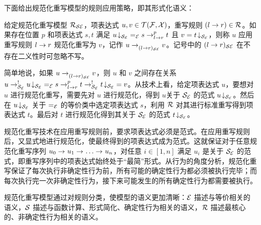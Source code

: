 下面给出规范化重写模型的规则应用策略，即其形式化语义：

\begin{definition}[规范化重写]
\label{d:normalrewriting}
给定规范化重写模型 $\RSE$，项表达式 $u,v\in\TFX$，重写规则 $(l \ra r) \in \cR$。如果存在位置 $p$ 和项表达式 $s,t$ 满足 
${\nf{u}{\SE}} =_{\cE} s \lrps{p}{l\ra r} t$ 且 $v = {\nf{t}{\SE}}$，则称 $u$ 应用重写规则 $l\ra r$ 规范化重写为 $v$，记作 $u\lrps{}{(l\ra r)_{\cS\cE}} v$。记号中的 $(l\ra r)_{\cS\cE}$ 在不存在二义性时可忽略不写。
\end{definition}

简单地说，如果 $u\lrps{}{(l\ra r)_{\cS\cE}}v$，则 $u$ 和 $v$ 之间存在关系 
$u \lrps{!}{\SE} {\nf{u}{\SE}} =_{\cE} s \lrps{p}{l\ra r} t \lrps{!}{\SE} {\nf{t}{\SE}} = v$。从技术上看，给定项表达式 $u$，要想对 $u$ 进行规范化重写，需要先对 $u$ 进行规范化，得到 $u $关于 $\SE$ 的范式 $\nf{u}{\SE}$。然后在 $\nf{u}{\SE}$ 关于 $=_{\cE}$ 的等价类中选定项表达式 $s$，利用 $\cR$ 对其进行标准重写得到项表达式 $t$。最后对 $t$ 进行规范化得到其关于 $\SE$ 的范式 $\nf{t}{\SE}$。

规范化重写技术在应用重写规则前，要求项表达式必须是范式。在应用重写规则后，又显式地进行规范化，使最终得到的项表达式成为范式。这就保证对于任意规范化重写序列 $u_0 \lrps{}{} u_1 \lrps{}{} \ldots \lrps{}{} u_n$，对任意 $i\in [1,n]$ 满足 $u_i$ 是关于 $\SE$ 的范式，即重写序列中的项表达式始终处于“最简”形式。从行为的角度分析，规范化重写保证了每次执行非确定性行为前，所有可能的确定性行为都必须被执行完毕；而每次执行完一次非确定性行为，接下来可能发生的所有确定性行为都需要被执行。

规范化重写模型通过对规则分类，使模型的语义更加清晰：$\cE$ 描述与等价相关的语义，$\cS$ 描述与函数计算、形式简化、确定性行为相关的语义，$\cR$ 描述最核心的、非确定性行为相关的语义。

